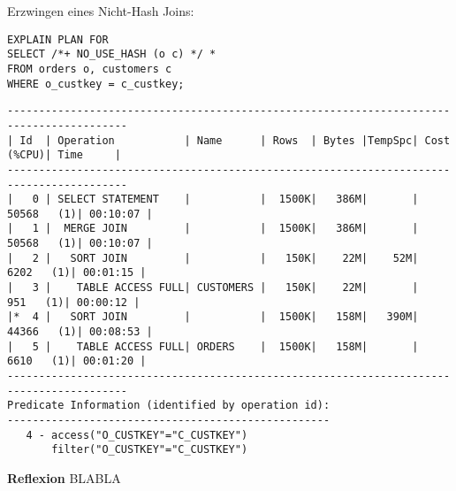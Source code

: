 \documentclass[10pt]{article}
\begin{document}
Erzwingen eines Nicht-Hash Joins:
\begin{lstlisting}[style=sql]
EXPLAIN PLAN FOR
SELECT /*+ NO_USE_HASH (o c) */ *
FROM orders o, customers c
WHERE o_custkey = c_custkey;
\end{lstlisting}
\begin{lstlisting}[style=queryexecutionplan]
-----------------------------------------------------------------------------------------
| Id  | Operation           | Name      | Rows  | Bytes |TempSpc| Cost (%CPU)| Time     |
-----------------------------------------------------------------------------------------
|   0 | SELECT STATEMENT    |           |  1500K|   386M|       | 50568   (1)| 00:10:07 |
|   1 |  MERGE JOIN         |           |  1500K|   386M|       | 50568   (1)| 00:10:07 |
|   2 |   SORT JOIN         |           |   150K|    22M|    52M|  6202   (1)| 00:01:15 |
|   3 |    TABLE ACCESS FULL| CUSTOMERS |   150K|    22M|       |   951   (1)| 00:00:12 |
|*  4 |   SORT JOIN         |           |  1500K|   158M|   390M| 44366   (1)| 00:08:53 |
|   5 |    TABLE ACCESS FULL| ORDERS    |  1500K|   158M|       |  6610   (1)| 00:01:20 |
-----------------------------------------------------------------------------------------
Predicate Information (identified by operation id):
---------------------------------------------------
   4 - access("O_CUSTKEY"="C_CUSTKEY")
       filter("O_CUSTKEY"="C_CUSTKEY")
\end{lstlisting}
\textbf{Reflexion} \newline
BLABLA
\end{document}
